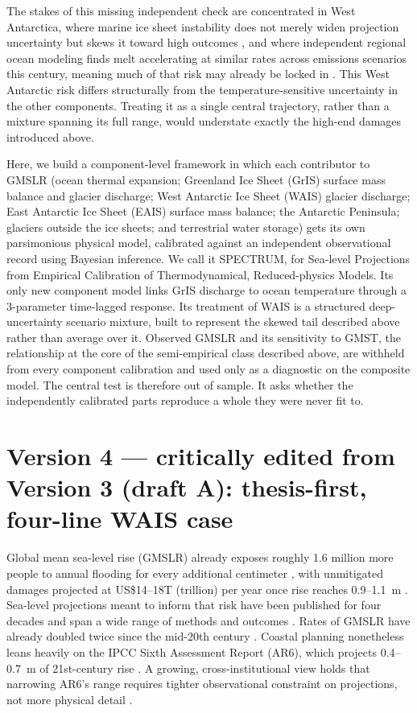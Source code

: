 \documentclass[12pt]{article}
\begin{document}
The stakes of this missing independent check are concentrated in West
Antarctica, where marine ice sheet instability does not merely widen
projection uncertainty but skews it toward high outcomes
\citep{Robel2019}, and where independent regional ocean modeling finds
melt accelerating at similar rates across emissions scenarios this
century, meaning much of that risk may already be locked in
\citep{Naughten2023}. This West Antarctic risk differs structurally from
the temperature-sensitive uncertainty in the other components. Treating
it as a single central trajectory, rather than a mixture spanning its
full range, would understate exactly the high-end damages introduced
above.

Here, we build a component-level framework in which each contributor to
GMSLR (ocean thermal expansion; Greenland Ice Sheet (GrIS) surface mass
balance and glacier discharge; West Antarctic Ice Sheet (WAIS) glacier
discharge; East Antarctic Ice Sheet (EAIS) surface mass balance; the
Antarctic Peninsula; glaciers outside the ice sheets; and terrestrial
water storage) gets its own parsimonious physical model, calibrated
against an independent observational record using Bayesian inference. We
call it SPECTRUM, for Sea-level Projections from Empirical Calibration of
Thermodynamical, Reduced-physics Models. Its only new component
model links GrIS discharge to ocean temperature through a 3-parameter
time-lagged response. Its treatment of WAIS is a structured
deep-uncertainty scenario mixture, built to represent the skewed tail
described above rather than average over it. Observed GMSLR and its
sensitivity to GMST, the relationship at the core of the semi-empirical
class described above, are withheld from every component calibration and
used only as a diagnostic on the composite model. The central test is
therefore out of sample. It asks whether the independently calibrated
parts reproduce a whole they were never fit to.

\section*{Version 4 --- critically edited from Version 3 (draft A): thesis-first, four-line WAIS case}

Global mean sea-level rise (GMSLR) already exposes roughly 1.6
million more people to annual flooding for every additional centimeter
\citep{Kulp2019}, with unmitigated damages projected at US\$14--18T
(trillion) per year once rise reaches 0.9--1.1~m \citep{Jevrejeva2018}.
Sea-level projections meant to inform that risk have been published for
four decades and span a wide range of methods and outcomes
\citep{Garner2026}. Rates of GMSLR have already doubled twice since the
mid-20th century \citep{Frederikse2020,Hamlington2024}. Coastal planning
nonetheless leans heavily on the IPCC Sixth Assessment Report (AR6),
which projects 0.4--0.7~m of 21st-century rise
\citep{Fox-Kemper2021,Hirschfeld2023}. A growing, cross-institutional
view holds that narrowing AR6's range requires tighter observational
constraint on projections, not more physical detail \citep{Felikson2025}.
\end{document}

